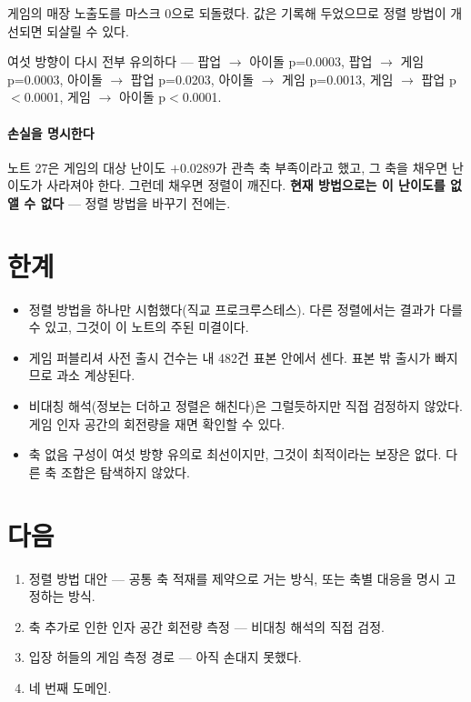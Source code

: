 \documentclass[10pt]{article}
\begin{document}
게임의 매장 노출도를 마스크 0으로 되돌렸다. 값은 기록해 두었으므로 정렬 방법이
개선되면 되살릴 수 있다.

여섯 방향이 다시 전부 유의하다 --- 팝업 $\to$ 아이돌 p=0.0003, 팝업 $\to$ 게임
p=0.0003, 아이돌 $\to$ 팝업 p=0.0203, 아이돌 $\to$ 게임 p=0.0013, 게임 $\to$ 팝업
p$<$0.0001, 게임 $\to$ 아이돌 p$<$0.0001.

\paragraph{손실을 명시한다}
노트 27은 게임의 대상 난이도 $+$0.0289가 관측 축 부족이라고 했고, 그 축을 채우면
난이도가 사라져야 한다. 그런데 채우면 정렬이 깨진다. \textbf{현재 방법으로는
이 난이도를 없앨 수 없다} --- 정렬 방법을 바꾸기 전에는.

\section{한계}

\begin{itemize}[leftmargin=1.1em,itemsep=0.15em]
\item 정렬 방법을 하나만 시험했다(직교 프로크루스테스). 다른 정렬에서는 결과가
      다를 수 있고, 그것이 이 노트의 주된 미결이다.
\item 게임 퍼블리셔 사전 출시 건수는 내 482건 표본 안에서 센다. 표본 밖 출시가
      빠지므로 과소 계상된다.
\item 비대칭 해석(정보는 더하고 정렬은 해친다)은 그럴듯하지만 직접 검정하지
      않았다. 게임 인자 공간의 회전량을 재면 확인할 수 있다.
\item 축 없음 구성이 여섯 방향 유의로 최선이지만, 그것이 최적이라는 보장은 없다.
      다른 축 조합은 탐색하지 않았다.
\end{itemize}

\section{다음}

\begin{enumerate}[leftmargin=1.3em,itemsep=0.15em]
\item 정렬 방법 대안 --- 공통 축 적재를 제약으로 거는 방식, 또는 축별 대응을
      명시 고정하는 방식.
\item 축 추가로 인한 인자 공간 회전량 측정 --- 비대칭 해석의 직접 검정.
\item 입장 허들의 게임 측정 경로 --- 아직 손대지 못했다.
\item 네 번째 도메인.
\end{enumerate}
\end{document}
